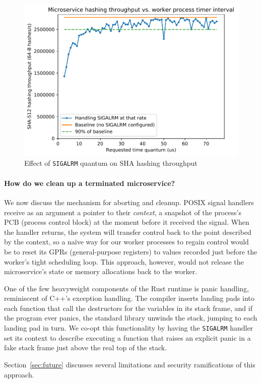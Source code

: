 \begin{figure}
\includegraphics[width=\columnwidth]{figs/2018-02-02-evaluation_quantum-hasher_throughput-throughput}
\caption{Effect of \texttt{SIGALRM} quantum on SHA hashing throughput}
\label{fig:hashtput}
\end{figure}

\paragraph{How do we clean up a terminated microservice?}
We now discuss the mechanism for aborting
and cleanup.  POSIX signal handlers receive as an argument a pointer to their
\textit{context}, a snapshot of the process's PCB (process control block) at the
moment before it received the signal.  When the handler returns, the system will
transfer control back to the point described by the context, so a naïve way for our
worker processes to regain control would be to reset its GPRs (general-purpose
registers) to values recorded just before the worker's tight scheduling loop.
This approach, however, would not release the microservice's state or memory
allocations back to the worker.

One of the few heavyweight components of the Rust runtime is panic handling,
reminiscent of C++'s exception handling.  The compiler inserts landing pads into each
function that call the destructors for the variables in its stack frame, and if the
program ever panics,
the standard library unwinds the stack, jumping to each landing pad in turn.  We
co-opt this functionality by having the \texttt{SIGALRM} handler set its context
to describe executing a function that raises an explicit panic in a fake stack frame
just above the real top of the stack.

Section~\ref{sec:future} discusses several limitations and security
ramifications of this approach.
